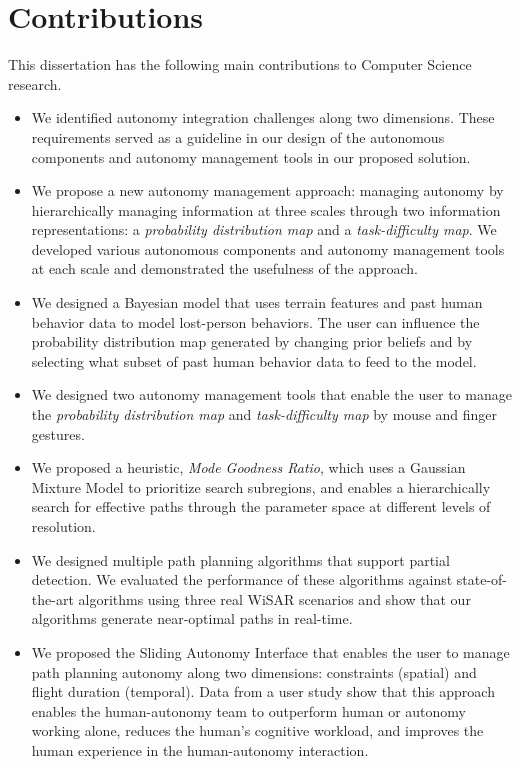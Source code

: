 \section{Contributions}
\label{contributions}

This dissertation has the following main contributions to Computer Science research.

\begin{itemize}
\item We identified autonomy integration challenges along two dimensions. These requirements served as a guideline in our design of the autonomous components and autonomy management tools in our proposed solution.
\item We propose a new autonomy management approach: managing autonomy by hierarchically managing information at three scales through two information representations: a \textit{probability distribution map} and a \textit{task-difficulty map}. We developed various autonomous components and autonomy management tools at each scale and demonstrated the usefulness of the approach.
\item We designed a Bayesian model that uses terrain features and past human behavior data to model lost-person behaviors. The user can influence the probability distribution map generated by changing prior beliefs and by selecting what subset of past human behavior data to feed to the model.
\item We designed two autonomy management tools that enable the user to manage the \textit{probability distribution map} and \textit{task-difficulty map} by mouse and finger gestures.
\item We proposed a heuristic, \textit{Mode Goodness Ratio}, which uses a Gaussian Mixture Model to prioritize search subregions, and enables a hierarchically search for effective paths through the parameter space at different levels of resolution.
\item We designed multiple path planning algorithms that support partial detection. We evaluated the performance of these algorithms against state-of-the-art algorithms using three real WiSAR scenarios and show that our algorithms generate near-optimal paths in real-time.
\item We proposed the Sliding Autonomy Interface that enables the user to manage path planning autonomy along two dimensions: constraints (spatial) and flight duration (temporal). Data from a user study show that this approach enables the human-autonomy team to outperform human or autonomy working alone, reduces the human's cognitive workload, and improves the human experience in the human-autonomy interaction.
\end{itemize}

